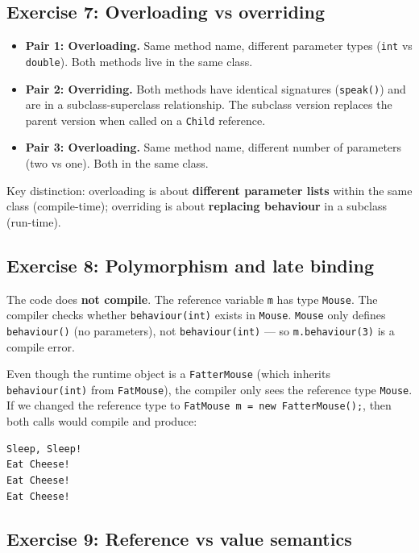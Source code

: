 \documentclass[twoside=false,DIV=14]{scrartcl}
\begin{document}
\subsection*{Exercise 7: Overloading vs overriding}

\begin{itemize}
    \item \textbf{Pair 1: Overloading.} Same method name, different parameter types (\texttt{int} vs \texttt{double}).  Both methods live in the same class.
    \item \textbf{Pair 2: Overriding.} Both methods have identical signatures (\texttt{speak()}) and are in a subclass-superclass relationship.  The subclass version replaces the parent version when called on a \texttt{Child} reference.
    \item \textbf{Pair 3: Overloading.} Same method name, different number of parameters (two vs one).  Both in the same class.
\end{itemize}

Key distinction: overloading is about \textbf{different parameter lists} within the same class (compile-time); overriding is about \textbf{replacing behaviour} in a subclass (run-time).

\subsection*{Exercise 8: Polymorphism and late binding}

The code does \textbf{not compile}.  The reference variable \texttt{m} has type \texttt{Mouse}.  The compiler checks whether \texttt{behaviour(int)} exists in \texttt{Mouse}.  \texttt{Mouse} only defines \texttt{behaviour()} (no parameters), not \texttt{behaviour(int)} --- so \texttt{m.behaviour(3)} is a compile error.

Even though the runtime object is a \texttt{FatterMouse} (which inherits \texttt{behaviour(int)} from \texttt{FatMouse}), the compiler only sees the reference type \texttt{Mouse}.  If we changed the reference type to \texttt{FatMouse m = new FatterMouse();}, then both calls would compile and produce:

\begin{verbatim}
Sleep, Sleep!
Eat Cheese!
Eat Cheese!
Eat Cheese!
\end{verbatim}

\subsection*{Exercise 9: Reference vs value semantics}
\end{document}
